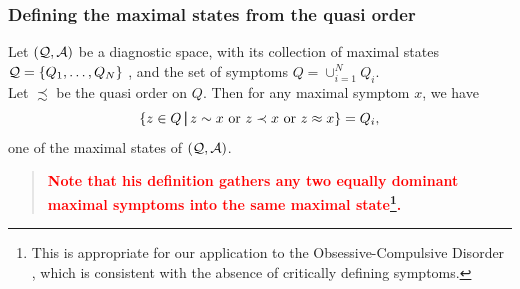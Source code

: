 \documentclass{beamer}
\def\tl{\vskip 2mm}
\def\AAA{{\cal A}}
\def\QQQ{{\cal Q}}
\def\st{{\;\vrule height8pt width0.7pt depth2.5pt\;}}
\def\rtxt#1{\textcolor{red}{#1}}
\begin{document}
\begin{frame}
\frametitle{ Defining the maximal states from the quasi order} 
\tl
\center
\begin{minipage}{11.7cm}
\begin{definition} Let $(\QQQ,\AAA)$ be a  diagnostic space, with its collection  of maximal states $\QQQ=\{Q_1,\ldots,Q_N\}$ , and the  set of symptoms $Q= \cup_{i=1}^N Q_i$.\\ Let $\precsim$ be the quasi order on $Q$. Then for any maximal symptom $x$, we have
$$ \{z\in Q\st z\sim x\text{ or } z\prec x \text{ or } z\approx x\} = Q_i,$$
one of the maximal states of $(\QQQ,\AAA)$.
\end{definition}
\begin{quote}\rtxt{\bf Note that his definition gathers any two equally dominant maximal symptoms into the same maximal state\footnote{This is appropriate for
our application to the Obsessive-Compulsive Disorder , which is consistent with the absence of critically defining symptoms.}.  }\end{quote}
\end{minipage}
 \vspace{.1cm}

\end{frame}
\end{document}
